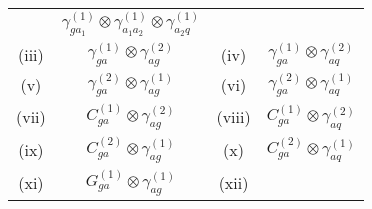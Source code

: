 \documentclass[12pt]{article}
\begin{document}
\begin{appendix}
\begin{table}
\begin{center}
\begin{tabular}{ |c|c||c|c| }
& $\gamma^{(1)}_{ga_{1}}\otimes\gamma^{(1)}_{a_{1}a_{2}}\otimes\gamma^{(1)}_{a_{2}q}$  \\

\multirow{1}{*}{(iii)} 

& $\gamma^{(1)}_{ga}\otimes\gamma^{(2)}_{ag}$

& \multirow{1}{*}{(iv)} 

& $\gamma^{(1)}_{ga}\otimes\gamma^{(2)}_{aq}$  \\
\multirow{1}{*}{(v)} 

& $\gamma^{(2)}_{ga}\otimes\gamma^{(1)}_{ag}$

& \multirow{1}{*}{(vi)} 

& $\gamma^{(2)}_{ga}\otimes\gamma^{(1)}_{aq}$  \\
\multirow{1}{*}{(vii)} 

& $C^{(1)}_{ga}\otimes\gamma^{(2)}_{ag}$

& \multirow{1}{*}{(viii)} 

& $C^{(1)}_{ga}\otimes\gamma^{(2)}_{aq}$  \\
\multirow{1}{*}{(ix)} 

& $C^{(2)}_{ga}\otimes\gamma^{(1)}_{ag}$

& \multirow{1}{*}{(x)} 

& $C^{(2)}_{ga}\otimes\gamma^{(1)}_{aq}$  \\
\multirow{1}{*}{(xi)} 

& $G^{(1)}_{ga}\otimes\gamma^{(1)}_{ag}$

& \multirow{1}{*}{(xii)} 


\end{tabular}
\end{center}
\end{table}
\end{appendix}
\end{document}
